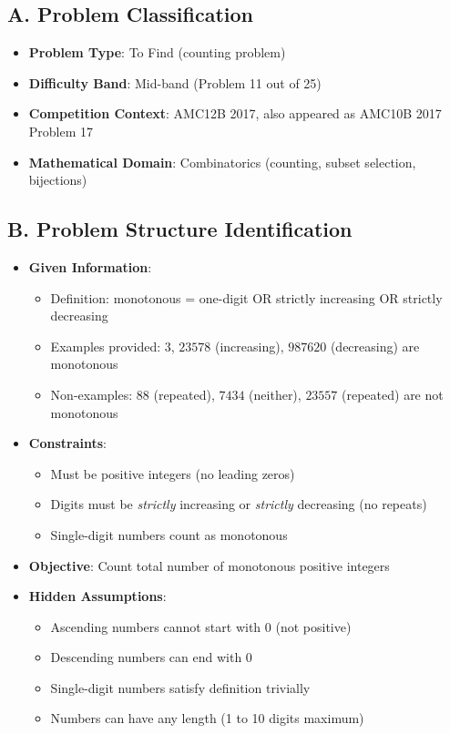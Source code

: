 \documentclass[]{article}
\begin{document}
\begin{problemconfigbox}
\subsection*{A. Problem Classification}
\begin{itemize}[leftmargin=*]
    \item \textbf{Problem Type}: To Find (counting problem)
    \item \textbf{Difficulty Band}: Mid-band (Problem 11 out of 25)
    \item \textbf{Competition Context}: AMC12B 2017, also appeared as AMC10B 2017 Problem 17
    \item \textbf{Mathematical Domain}: Combinatorics (counting, subset selection, bijections)
\end{itemize}

\subsection*{B. Problem Structure Identification}
\begin{itemize}[leftmargin=*]
    \item \textbf{Given Information}: 
    \begin{itemize}
        \item Definition: monotonous = one-digit OR strictly increasing OR strictly decreasing
        \item Examples provided: $3$, $23578$ (increasing), $987620$ (decreasing) are monotonous
        \item Non-examples: $88$ (repeated), $7434$ (neither), $23557$ (repeated) are not monotonous
    \end{itemize}
    
    \item \textbf{Constraints}: 
    \begin{itemize}
        \item Must be positive integers (no leading zeros)
        \item Digits must be \emph{strictly} increasing or \emph{strictly} decreasing (no repeats)
        \item Single-digit numbers count as monotonous
    \end{itemize}
    
    \item \textbf{Objective}: Count total number of monotonous positive integers
    
    \item \textbf{Hidden Assumptions}: 
    \begin{itemize}
        \item Ascending numbers cannot start with 0 (not positive)
        \item Descending numbers can end with 0
        \item Single-digit numbers satisfy definition trivially
        \item Numbers can have any length (1 to 10 digits maximum)
    \end{itemize}
    

\end{itemize}
\end{problemconfigbox}
\end{document}

